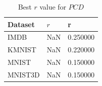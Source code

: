 \begin{table}
\caption{Best $r$ value for $PCD$}
\label{tab:best-pcd}
\begin{tabular}{ll}
\toprule
Dataset & $r$ & r \\
\midrule
IMDB & NaN & 0.250000 \\
KMNIST & NaN & 0.220000 \\
MNIST & NaN & 0.150000 \\
MNIST3D & NaN & 0.150000 \\
\bottomrule
\end{tabular}
\end{table}
